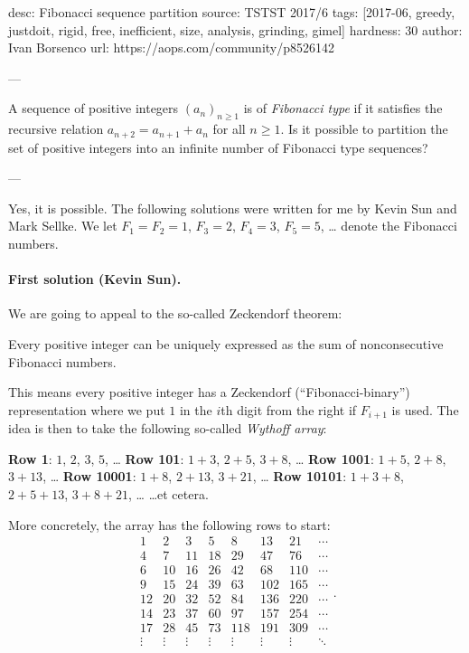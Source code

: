 desc: Fibonacci sequence partition
source: TSTST 2017/6
tags: [2017-06, greedy, justdoit, rigid, free, inefficient, size, analysis, grinding, gimel]
hardness: 30
author: Ivan Borsenco
url: https://aops.com/community/p8526142

---

A sequence of positive integers $(a_{n})_{n \geq 1}$ is of
\emph{Fibonacci type} if it satisfies the recursive relation
$a_{n+2}=a_{n+1}+a_{n}$ for all $n \geq 1$.
Is it possible to partition the set of positive integers
into an infinite number of Fibonacci type sequences?

---

Yes, it is possible.
The following solutions were written for me by Kevin Sun and Mark Sellke.
We let $F_1 = F_2 = 1$, $F_3 = 2$, $F_4 = 3$, $F_5 = 5$, \dots
denote the Fibonacci numbers.

\paragraph{First solution (Kevin Sun).}
We are going to appeal to the so-called Zeckendorf theorem:
\begin{theorem*}
  [Zeckendorf]
  Every positive integer can be uniquely expressed
  as the sum of nonconsecutive Fibonacci numbers.
\end{theorem*}
This means every positive integer has a
Zeckendorf (``Fibonacci-binary'') representation
where we put $1$ in the $i$th digit from the right
if $F_{i+1}$ is used.
The idea is then to take the following so-called \emph{Wythoff array}:
\begin{itemize}
  \ii \textbf{Row 1}: $1$, $2$, $3$, $5$, \dots
  \ii \textbf{Row 101}: $1+3$, $2+5$, $3+8$, \dots
  \ii \textbf{Row 1001}: $1+5$, $2+8$, $3+13$, \dots
  \ii \textbf{Row 10001}: $1+8$, $2+13$, $3+21$, \dots
  \ii \textbf{Row 10101}: $1+3+8$, $2+5+13$, $3+8+21$, \dots
  \ii \dots et cetera.
\end{itemize}
More concretely, the array has the following rows to start:
\[
\begin{matrix}
1&2&3&5&8&13&21&\dotsb\\
4&7&11&18&29&47&76&\dotsb\\
6&10&16&26&42&68&110&\dotsb\\
9&15&24&39&63&102&165&\dotsb\\
12&20&32&52&84&136&220&\dotsb\\
14&23&37&60&97&157&254&\dotsb\\
17&28&45&73&118&191&309&\dotsb\\
\vdots&\vdots&\vdots&\vdots&\vdots&\vdots&\vdots&\ddots\\
\end{matrix}.
\]

